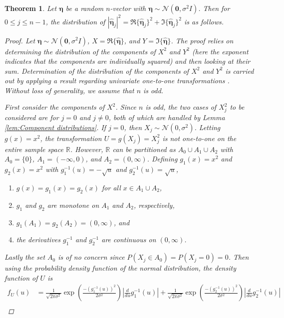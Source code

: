 \documentclass[12pt]{article}
\newcommand{\noiseSD}{\sigma}	%
\newcommand{\noise}{\bm{\eta}}	%
\newtheorem{theorem}{Theorem}[section]
\begin{document}
\begin{theorem}
Let $\noise$ be a random $n$-vector with $\noise \sim \mathcal{N}(\bm{0},\noiseSD^2 I)$. Then for $0 \leq j \leq n-1$, the distribution of $|\widehat{\noise}_j|^2 = \Re\{\widehat{\noise}_j\}^2 + \Im\{\widehat{\noise}_j\}^2$ is as follows.

\begin{proof}
Let $\noise \sim \mathcal{N}(\bm{0},\noiseSD^2 I)$, $X = \Re\{\widehat{\noise}\}$, and $Y = \Im\{\widehat{\noise}\}$. The proof relies on determining the distribution of the components of $X^2$ and $Y^2$ (here the exponent indicates that the components are individually squared) and then looking at their sum. Determination of the distribution of the components of $X^2$ and $Y^2$ is carried out by applying a result regarding univariate one-to-one transformations \cite{CasellaBerger02}. Without loss of generality, we assume that $n$ is odd. \par
First consider the components of $X^2$. Since $n$ is odd, the two cases of $X^2_j$ to be considered are for $j = 0$ and $j \neq 0$, both of which are handled by Lemma \ref{lem:Component distributions}. If $j = 0$, then $X_j \sim \mathcal{N}(0,\noiseSD^2)$. Letting $g(x) = x^2$, the transformation $U = g(X_j) = X^2_j$ is not one-to-one on the entire sample space $\mathbb{R}$. However, $\mathbb{R}$ can be partitioned as $A_0 \cup A_1 \cup A_2$ with $A_0 = \{0\}$, $A_1 = (-\infty,0)$, and $A_2 = (0,\infty)$. Defining $g_1(x) = x^2$ and $g_2(x) = x^2$ with $g_1^{-1}(u) = -\sqrt{u}$ and $g_2^{-1}(u) = \sqrt{u}$,
\begin{enumerate}
\item $g(x) = g_1(x) = g_2(x)$ for all $x \in A_1 \cup A_2$,
\item $g_1$ and $g_2$ are monotone on $A_1$ and $A_2$, respectively,
\item $g_1(A_1) = g_2(A_2) = (0,\infty)$, and
\item the derivatives $g_1^{-1}$ and $g_2^{-1}$ are continuous on $(0,\infty)$.
\end{enumerate}
Lastly the set $A_0$ is of no concern since $P(X_j \in A_0) = P(X_j = 0) = 0$. Then using the probability density function of the normal distribution, the density function of $U$ is
\begin{align*}
f_U(u) &= \frac{1}{\sqrt{2\pi\noiseSD^2}}\exp\left(\frac{-(g_1^{-1}(u))^2}{2\noiseSD^2}\right)\left|\frac{d}{du}g_1^{-1}(u)\right| + \frac{1}{\sqrt{2\pi\noiseSD^2}}\exp\left(\frac{-(g_2^{-1}(u))^2}{2\noiseSD^2}\right)\left|\frac{d}{du}g_2^{-1}(u)\right| \\

\end{align*}
\end{proof}
\end{theorem}
\end{document}
